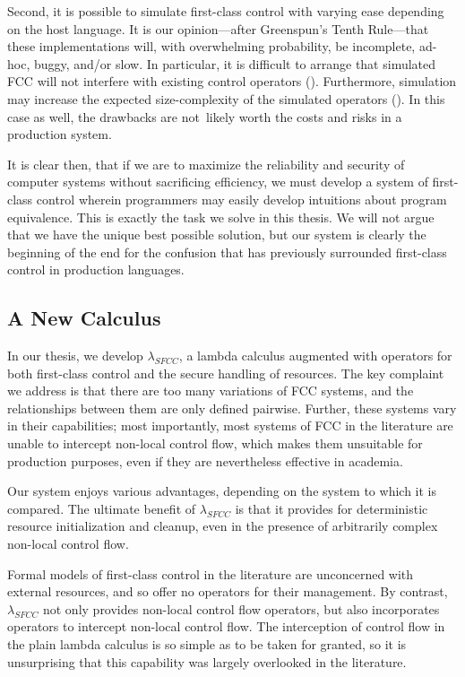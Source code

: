 \documentclass[11pt]{article}
\newcommand{\maybePage}{\null}
\begin{document}
Second, it is possible to simulate first-class control with varying ease depending on the host language.
It is our opinion---after Greenspun's Tenth Rule---that these implementations will, with overwhelming probability, be incomplete, ad-hoc, buggy, and/or slow.
In particular, it is difficult to arrange that simulated FCC will not interfere with existing control operators (\cite{addDelimControlProduction}).
Furthermore, simulation may increase the expected size-complexity of the simulated operators (\cite{finalShiftForCallcc}).
In this case as well, the drawbacks are not~likely worth the costs and risks in a production system.


It is clear then, that if we are to maximize the reliability and security of computer systems without sacrificing efficiency, we must develop a system of first-class control wherein programmers may easily develop intuitions about program equivalence.
This is exactly the task we solve in this thesis.
We will not argue that we have the unique best possible solution, but our system is clearly the beginning of the end for the confusion that has previously surrounded first-class control in production languages.

\maybePage
\subsection{A New Calculus}

In our thesis, we develop $\lambda_{SFCC}$, a lambda calculus augmented with operators for both first-class control and the secure handling of resources.
The key complaint we address is that there are too many variations of FCC systems, and the relationships between them are only defined pairwise.
Further, these systems vary in their capabilities; most importantly, most systems of FCC in the literature are unable to intercept non-local control flow, which makes them unsuitable for production purposes, even if they are nevertheless effective in academia.

Our system enjoys various advantages, depending on the system to which it is compared.
The ultimate benefit of $\lambda_{SFCC}$ is that it provides for deterministic resource initialization and cleanup, even in the presence of arbitrarily complex non-local control flow.

Formal models of first-class control in the literature are unconcerned with external resources, and so offer no operators for their management.
By contrast, $\lambda_{SFCC}$ not only provides non-local control flow operators, but also incorporates operators to intercept non-local control flow.
The interception of control flow in the plain lambda calculus is so simple as to be taken for granted, so it is unsurprising that this capability was largely overlooked in the literature.
\end{document}
